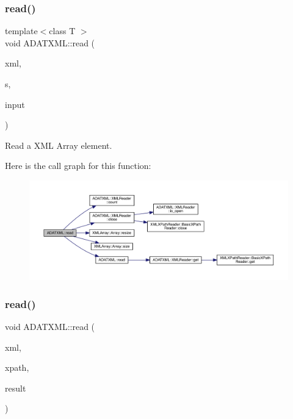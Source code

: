 \mbox{\label{group__io_gae46a9532d6b16b2a3dc58d889eb1d688}} 
\subsubsection{\texorpdfstring{read()}{read()}\hspace{0.1cm}{\footnotesize\ttfamily [23/52]}}
{\footnotesize\ttfamily template$<$class T $>$ \\
void A\+D\+A\+T\+X\+M\+L\+::read (\begin{DoxyParamCaption}\item[{\mbox{\hyperlink{classADATXML_1_1XMLReader}{X\+M\+L\+Reader}} \&}]{xml,  }\item[{const std\+::string \&}]{s,  }\item[{\mbox{\hyperlink{classXMLArray_1_1Array}{X\+M\+L\+Array\+::\+Array}}$<$ T $>$ \&}]{input }\end{DoxyParamCaption})\hspace{0.3cm}{\ttfamily [inline]}}



Read a X\+ML Array element. 

Here is the call graph for this function\+:\nopagebreak
\begin{figure}[H]
\begin{center}
\leavevmode
\includegraphics[width=350pt]{d2/da3/group__io_gae46a9532d6b16b2a3dc58d889eb1d688_cgraph}
\end{center}
\end{figure}
\mbox{\label{group__io_gaba3ec8cd866164ea8bdc810edeaf8210}} 
\subsubsection{\texorpdfstring{read()}{read()}\hspace{0.1cm}{\footnotesize\ttfamily [24/52]}}
{\footnotesize\ttfamily void A\+D\+A\+T\+X\+M\+L\+::read (\begin{DoxyParamCaption}\item[{\mbox{\hyperlink{classADATXML_1_1XMLReader}{X\+M\+L\+Reader}} \&}]{xml,  }\item[{const std\+::string \&}]{xpath,  }\item[{std\+::vector$<$ int $>$ \&}]{result }\end{DoxyParamCaption})}



